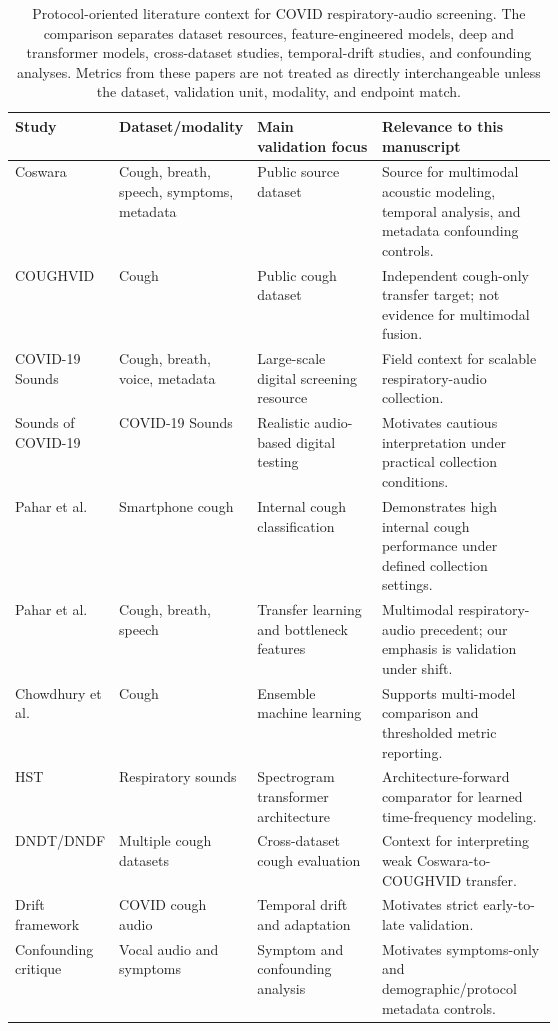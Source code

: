 \documentclass[preprint,12pt]{elsarticle}
\begin{document}
\begin{table}[t]
\centering
\caption{Protocol-oriented literature context for COVID respiratory-audio screening. The comparison separates dataset resources, feature-engineered models, deep and transformer models, cross-dataset studies, temporal-drift studies, and confounding analyses. Metrics from these papers are not treated as directly interchangeable unless the dataset, validation unit, modality, and endpoint match.}
\label{tab:literature_context}
\scriptsize
\setlength{\tabcolsep}{2.5pt}
\begin{tabularx}{\linewidth}{p{0.18\linewidth} p{0.22\linewidth} p{0.23\linewidth} X}
\toprule
Study & Dataset/modality & Main validation focus & Relevance to this manuscript \\
\midrule
Coswara \citep{bhattacharya2023coswara} & Cough, breath, speech, symptoms, metadata & Public source dataset & Source for multimodal acoustic modeling, temporal analysis, and metadata confounding controls. \\
COUGHVID \citep{orlandic2021coughvid} & Cough & Public cough dataset & Independent cough-only transfer target; not evidence for multimodal fusion. \\
COVID-19 Sounds \citep{xia2021covid} & Cough, breath, voice, metadata & Large-scale digital screening resource & Field context for scalable respiratory-audio collection. \\
Sounds of COVID-19 \citep{han2022sounds} & COVID-19 Sounds & Realistic audio-based digital testing & Motivates cautious interpretation under practical collection conditions. \\
Pahar et al. \citep{pahar2021global} & Smartphone cough & Internal cough classification & Demonstrates high internal cough performance under defined collection settings. \\
Pahar et al. \citep{pahar2022transfer} & Cough, breath, speech & Transfer learning and bottleneck features & Multimodal respiratory-audio precedent; our emphasis is validation under shift. \\
Chowdhury et al. \citep{chowdhury2022mcdm} & Cough & Ensemble machine learning & Supports multi-model comparison and thresholded metric reporting. \\
HST \citep{aytekin2024hst} & Respiratory sounds & Spectrogram transformer architecture & Architecture-forward comparator for learned time-frequency modeling. \\
DNDT/DNDF \citep{islam2026eswa} & Multiple cough datasets & Cross-dataset cough evaluation & Context for interpreting weak Coswara-to-COUGHVID transfer. \\
Drift framework \citep{ganitidis2025jmir} & COVID cough audio & Temporal drift and adaptation & Motivates strict early-to-late validation. \\
Confounding critique \citep{coppock2024nmi} & Vocal audio and symptoms & Symptom and confounding analysis & Motivates symptoms-only and demographic/protocol metadata controls. \\
\bottomrule
\end{tabularx}
\end{table}
\end{document}
